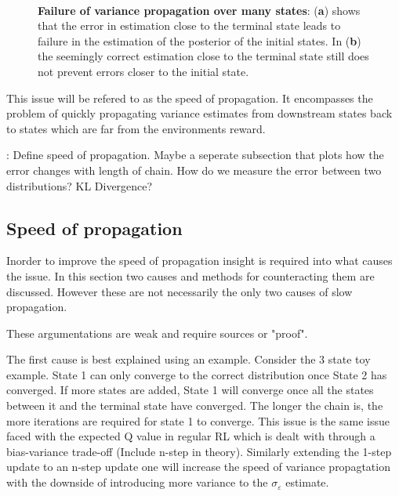 \begin{figure}[H]
    \centering
    \\
    \caption{\textbf{Failure of variance propagation over many states}: (\textbf{a}) shows that the error in estimation close to the terminal state leads to failure in the estimation of the posterior of the initial states. In (\textbf{b}) the seemingly correct estimation close to the terminal state still does not prevent errors closer to the initial state.}
    \label{fig:longproptest}
\end{figure}

This issue will be refered to as the speed of propagation. It encompasses the problem of quickly propagating variance estimates from downstream states back to states which are far from the environments reward.

\todo: Define speed of propagation. Maybe a seperate subsection that plots how the error changes with length of chain. How do we measure the error between two distributions? KL Divergence?

\subsection{Speed of propagation}

Inorder to improve the speed of propagation insight is required into what causes the issue. In this section two causes and methods for counteracting them are discussed. However these are not necessarily the only two causes of slow propagation.

\todo These argumentations are weak and require sources or "proof". 

The first cause is best explained using an example. Consider the 3 state toy example. State 1 can only converge to the correct distribution once State 2 has converged. If more states are added, State 1 will converge once all the states between it and the terminal state have converged. The longer the chain is, the more iterations are required for state 1 to converge. This issue is the same issue faced with the expected Q value in regular RL which is dealt with through a bias-variance trade-off (\todo Include n-step in theory). Similarly extending the 1-step update to an n-step update one will increase the speed of variance propagtation with the downside of introducing more variance to the $\sigma_\varepsilon$ estimate.

